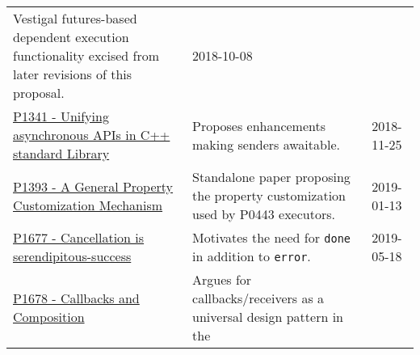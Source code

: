 \documentclass[a4paper,12pt,notitlepage,twoside,openright]{article}
\begin{document}
\begin{longtable}[]{@{}lll@{}}
\begin{minipage}[t]{0.54\columnwidth}
Vestigal futures-based dependent execution functionality excised from
later revisions of this proposal.\strut
\end{minipage} & \begin{minipage}[t]{0.05\columnwidth}\raggedright
2018-10-08\strut
\end{minipage}\tabularnewline
\begin{minipage}[t]{0.32\columnwidth}\raggedright
\href{https://wg21.link/P1341}{P1341 - Unifying asynchronous APIs in C++
standard Library}\strut
\end{minipage} & \begin{minipage}[t]{0.54\columnwidth}\raggedright
Proposes enhancements making senders awaitable.\strut
\end{minipage} & \begin{minipage}[t]{0.05\columnwidth}\raggedright
2018-11-25\strut
\end{minipage}\tabularnewline
\begin{minipage}[t]{0.32\columnwidth}\raggedright
\href{https://wg21.link/P1393}{P1393 - A General Property Customization
Mechanism}\strut
\end{minipage} & \begin{minipage}[t]{0.54\columnwidth}\raggedright
Standalone paper proposing the property customization used by P0443
executors.\strut
\end{minipage} & \begin{minipage}[t]{0.05\columnwidth}\raggedright
2019-01-13\strut
\end{minipage}\tabularnewline
\begin{minipage}[t]{0.32\columnwidth}\raggedright
\href{https://wg21.link/P1677}{P1677 - Cancellation is
serendipitous-success}\strut
\end{minipage} & \begin{minipage}[t]{0.54\columnwidth}\raggedright
Motivates the need for \texttt{done} in addition to
\texttt{error}.\strut
\end{minipage} & \begin{minipage}[t]{0.05\columnwidth}\raggedright
2019-05-18\strut
\end{minipage}\tabularnewline
\begin{minipage}[t]{0.32\columnwidth}\raggedright
\href{https://wg21.link/P1678}{P1678 - Callbacks and Composition}\strut
\end{minipage} & \begin{minipage}[t]{0.54\columnwidth}\raggedright
Argues for callbacks/receivers as a universal design pattern in the

\end{minipage}
\end{longtable}
\end{document}
